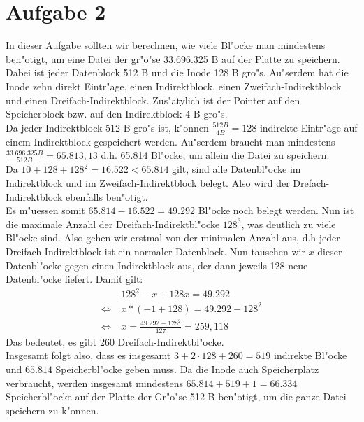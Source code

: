 \documentclass{ti2}
\begin{document}
\section*{Aufgabe 2}
In dieser Aufgabe sollten wir berechnen, wie viele Bl"ocke man mindestens ben"otigt, um eine Datei der gr"o"se 33.696.325 B auf der Platte zu speichern. Dabei ist jeder Datenblock 512 B und die Inode 128 B gro"s. Au"serdem hat die Inode zehn direkt Eintr"age, einen Indirektblock, einen Zweifach-Indirektblock und einen Dreifach-Indirektblock. Zus"atylich ist der Pointer auf den Speicherblock bzw. auf den Indirektblock 4 B gro"s.\\
Da jeder Indirektblock 512 B gro"s ist, k"onnen $\frac{512 B}{4 B}=128$ indirekte Eintr"age auf einem Indirektblock gespeichert werden. Au"serdem braucht man mindestens $\frac{33.696.325 B}{512 B}=65.813,13$ d.h. 65.814 Bl"ocke, um allein die Datei zu speichern.\\
Da $10+128+128^2=16.522 < 65.814$ gilt, sind alle Datenbl"ocke im Indirektblock und im Zweifach-Indirektblock belegt. Also wird der Drefach-Indirektblock ebenfalls ben"otigt. \\
Es m"uessen somit $65.814-16.522=49.292$ Bl"ocke noch belegt werden. Nun ist die maximale Anzahl der Dreifach-Indirektbl"ocke $128^3$, was deutlich zu viele Bl"ocke sind. Also gehen wir erstmal von der minimalen Anzahl aus, d.h jeder Dreifach-Indirektblock ist ein normaler Datenblock. Nun tauschen wir $x$ dieser Datenbl"ocke gegen einen Indirektblock aus, der dann jeweils 128 neue Datenbl"ocke  liefert. Damit gilt:
\begin{align*}
& 128^2-x+128x=49.292 \\
\Leftrightarrow\ & x*(-1+128)=49.292-128^2 \\
\Leftrightarrow\ & x=\frac{49.292-128^2}{127}=259,118
\end{align*}
Das bedeutet, es gibt 260 Dreifach-Indirektbl"ocke. \\
Insgesamt folgt also, dass es insgesamt $3+2 \cdot{} 128+260=519$ indirekte Bl"ocke und $65.814$ Speicherbl"ocke geben muss. Da die Inode auch Speicherplatz verbraucht, werden insgesamt mindestens $65.814 + 519 + 1=66.334$ Speicherbl"ocke auf der Platte der Gr"o"se 512 B ben"otigt, um die ganze Datei speichern zu k"onnen.
\end{document}
